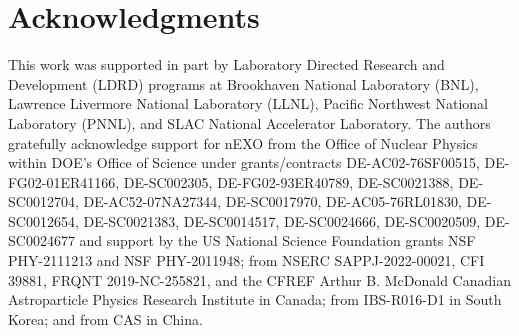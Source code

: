\documentclass[final,3p,times]{elsarticle}
\begin{document}
\section{Acknowledgments}
This work was supported in part by Laboratory Directed Research and Development (LDRD) programs at Brookhaven National Laboratory (BNL), Lawrence Livermore National Laboratory (LLNL), Pacific Northwest National Laboratory (PNNL), and SLAC National Accelerator Laboratory. The authors gratefully acknowledge support for nEXO from the Office of Nuclear Physics within DOE’s Office of Science under grants/contracts DE-AC02-76SF00515, DE-FG02-01ER41166, DE-SC002305, DE-FG02-93ER40789, DE-SC0021388, DE-SC0012704, DE-AC52-07NA27344, DE‐SC0017970, DE-AC05-76RL01830, DE-SC0012654, DE-SC0021383, DE-SC0014517, DE-SC0024666, DE-SC0020509, DE-SC0024677 and support by the US National Science Foundation grants NSF PHY-2111213 and NSF PHY-2011948; from NSERC SAPPJ-2022-00021, CFI 39881, FRQNT 2019-NC-255821, and the CFREF Arthur B. McDonald Canadian Astroparticle Physics Research Institute in Canada; from IBS-R016-D1 in South Korea; and from CAS in China. 



\end{document}
